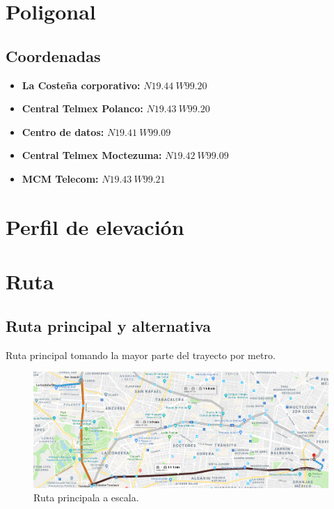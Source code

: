 \documentclass[12pt,letterpaper]{article}
\begin{document}


\newpage
\tableofcontents
\listoffigures
\listoftables

\newpage
\section{Poligonal}
\subsection{Coordenadas}
\begin{itemize}
    \item \textbf{La Costeña corporativo:} $N 19.44 \ W 99.20$
    \item \textbf{Central Telmex Polanco:} $N 19.43 \ W 99.20$
    \item \textbf{Centro de datos:} $N 19.41 \ W 99.09$
    \item \textbf{Central Telmex Moctezuma:} $N 19.42 \ W 99.09$
    \item \textbf{MCM Telecom:} $N 19.43 \ W 99.21$
\end{itemize}

\newpage
\section{Perfil de elevación }

\newpage
\section{Ruta}
\subsection{Ruta principal y alternativa}
Ruta principal tomando la mayor parte del trayecto por metro.
\begin{figure}[ht]
    \centering
    \includegraphics[width=.9\textwidth]{f2.png}
    \caption{Ruta principala a escala.}
\end{figure}
\end{document}
